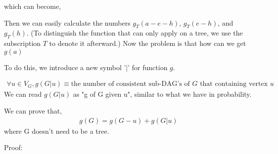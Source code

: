 \documentclass[11pt]{article}
\begin{document}
	which can become,
	
	\hspace*{\fill}\hspace*{\fill}
	\hspace*{\fill}
	\hspace*{\fill}
			
	Then we can easily calculate the numbers $g_T(a-e-h)$, $g_T(e-h)$, and $g_T(h)$. (To distinguish the function that can only apply on a tree, we use the subscription $T$ to denote it afterward.) Now the problem is that how can we get $g(a)$
	
	To do this, we introduce a new symbol '$|$' for function $g$.
	
	\begin{align*}
		\forall u \in V_G, g(G|u) \equiv \text{the number of consistent sub-DAG's of $G$ that containing vertex $u$}
	\end{align*}
	We can read $g(G|u)$ as "g of G given u", similar to what we have in probability.
	
	\bigskip
	We can prove that,
	\begin{align} \label{eqn2}
		g(G) = g(G-u) + g(G|u)
	\end{align}
	where G doesn't need to be a tree.
	
	\bigskip
	Proof:
	
\end{document}
